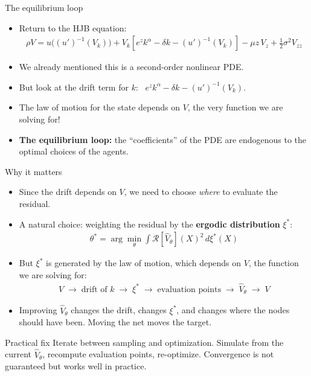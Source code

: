 \documentclass[aspectratio=169,10pt]{beamer}
\newcommand{\emphcolor}[1]{\textbf{\textcolor{emphcolorval}{#1}}}
\newcommand{\Resid}{\mathcal{R}}
\begin{document}
\begin{frame}{The equilibrium loop}
	\begin{itemize}
		\item Return to the HJB equation:
		\begin{align*}
			\rho V = u\big((u')^{-1}(V_k)\big) + V_k\!\left[e^z k^\alpha - \delta k - (u')^{-1}(V_k)\right] - \mu z\, V_z + \tfrac{1}{2}\sigma^2 V_{zz}
		\end{align*}
		\vspace{0.05in}
		\item We already mentioned this is a second-order nonlinear PDE.
		\item But look at the drift term for $k$: \ $e^z k^\alpha - \delta k - (u')^{-1}(V_k)$.
		\item The law of motion for the state depends on $V$, the very function we are solving for!
		\vspace{0.05in}
		\item \emphcolor{The equilibrium loop:} the ``coefficients'' of the PDE are endogenous to the optimal choices of the agents.
	\end{itemize}
\end{frame}

\begin{frame}{Why it matters}
	\begin{itemize}
		\item Since the drift depends on $V$, we need to choose \emph{where} to evaluate the residual.
		\item A natural choice: weighting the residual by the \emphcolor{ergodic distribution} $\xi^*$:
		\begin{align*}
			\theta^* = \arg\min_\theta \int \Resid[\widehat{V}_\theta](X)^2\, d\xi^*(X)
		\end{align*}
		\item But $\xi^*$ is generated by the law of motion, which depends on $V$, the function we are solving for:
		\begin{align*}
			V \;\longrightarrow\; \text{drift of } k \;\longrightarrow\; \xi^* \;\longrightarrow\; \text{evaluation points} \;\longrightarrow\; \widehat{V}_\theta \;\longrightarrow\; V
		\end{align*}
		\item Improving $\widehat{V}_\theta$ changes the drift, changes $\xi^*$, and changes where the nodes should have been. Moving the net moves the target.
	\end{itemize}
	\begin{block}{Practical fix}
		Iterate between sampling and optimization. Simulate from the current $\widehat{V}_\theta$, recompute evaluation points, re-optimize. Convergence is not guaranteed but works well in practice.
	\end{block}
\end{frame}
\end{document}
